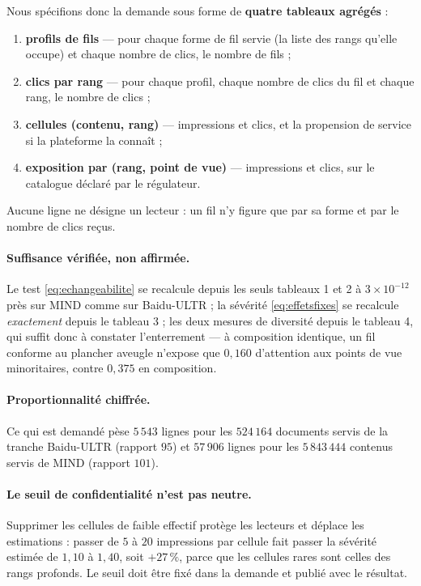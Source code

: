 \documentclass[11pt,a4paper]{article}
\begin{document}
Nous spécifions donc la demande sous forme de \textbf{quatre tableaux agrégés} :

\begin{enumerate}
\item \textbf{profils de fils} --- pour chaque forme de fil servie (la liste des rangs
      qu'elle occupe) et chaque nombre de clics, le nombre de fils ;
\item \textbf{clics par rang} --- pour chaque profil, chaque nombre de clics du fil et chaque
      rang, le nombre de clics ;
\item \textbf{cellules (contenu, rang)} --- impressions et clics, et la propension de service
      si la plateforme la connaît ;
\item \textbf{exposition par (rang, point de vue)} --- impressions et clics, sur le catalogue
      déclaré par le régulateur.
\end{enumerate}

Aucune ligne ne désigne un lecteur : un fil n'y figure que par sa forme et par le nombre de
clics reçus.

\paragraph{Suffisance vérifiée, non affirmée.} Le test \eqref{eq:echangeabilite} se recalcule
depuis les seuls tableaux 1 et 2 à $3 \times 10^{-12}$ près sur MIND comme sur Baidu-ULTR ;
la sévérité \eqref{eq:effetsfixes} se recalcule \emph{exactement} depuis le tableau 3 ; les
deux mesures de diversité depuis le tableau 4, qui suffit donc à constater l'enterrement --- à
composition identique, un fil conforme au plancher aveugle n'expose que $0{,}160$ d'attention
aux points de vue minoritaires, contre $0{,}375$ en composition.

\paragraph{Proportionnalité chiffrée.} Ce qui est demandé pèse $5\,543$ lignes pour les
$524\,164$ documents servis de la tranche Baidu-ULTR (rapport $95$) et $57\,906$ lignes pour
les $5\,843\,444$ contenus servis de MIND (rapport $101$).

\paragraph{Le seuil de confidentialité n'est pas neutre.} Supprimer les cellules de faible
effectif protège les lecteurs et déplace les estimations : passer de $5$ à $20$ impressions
par cellule fait passer la sévérité estimée de $1{,}10$ à $1{,}40$, soit $+27\,\%$, parce que
les cellules rares sont celles des rangs profonds. Le seuil doit être fixé dans la demande et
publié avec le résultat.
\end{document}
